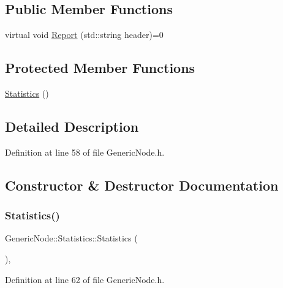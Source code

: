 \subsection*{Public Member Functions}
\begin{DoxyCompactItemize}
\item 
virtual void \hyperlink{class_generic_node_1_1_statistics_ada017fd13bc1b6704d6c7d15ba9ed8df}{Report} (std\+::string header)=0
\end{DoxyCompactItemize}
\subsection*{Protected Member Functions}
\begin{DoxyCompactItemize}
\item 
\hyperlink{class_generic_node_1_1_statistics_a44bbd90b9b25e615898e32511b28a58b}{Statistics} ()
\end{DoxyCompactItemize}


\subsection{Detailed Description}


Definition at line 58 of file Generic\+Node.\+h.



\subsection{Constructor \& Destructor Documentation}
\mbox{\label{class_generic_node_1_1_statistics_a44bbd90b9b25e615898e32511b28a58b}} 
\subsubsection{\texorpdfstring{Statistics()}{Statistics()}}
{\footnotesize\ttfamily Generic\+Node\+::\+Statistics\+::\+Statistics (\begin{DoxyParamCaption}{ }\end{DoxyParamCaption})\hspace{0.3cm}{\ttfamily [inline]}, {\ttfamily [protected]}}



Definition at line 62 of file Generic\+Node.\+h.



